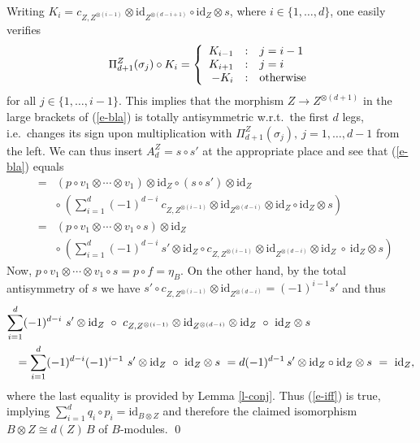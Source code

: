 \documentclass[11pt]{article}
\theoremstyle{definition}
\theoremstyle{definition}
\theoremstyle{remark}
\newcommand{\mcirc}{\circ}
\newcommand{\rarr}{\rightarrow}
\def\id{\mathrm{id}}
\begin{document}
Writing $K_i=c_{Z,Z^{\otimes(i-1)}}\otimes\id_{Z^{\otimes(d-i+1)}} \circ \id_Z\otimes s$, where
$i\in\{1,\ldots,d\}$, one easily verifies
\[ \Pi^Z_{d+1}(\sigma_j)\mcirc K_i= \left\{ 
\begin{array} {r@{\quad:\quad}l}
  K_{i-1} & j=i-1 \\ K_{i+1} & j=i \\ -K_i & \mbox{otherwise}
\end{array}\right. \]
for all $j\in\{1,\ldots,i-1\}$. This implies that the morphism $Z\rarr Z^{\otimes (d+1)}$ in the
large brackets of (\ref{e-bla}) is totally antisymmetric w.r.t.\ the first $d$ legs, i.e.\ changes
its sign upon multiplication with $\Pi_{d+1}^Z(\sigma_j),\ j=1,\ldots,d-1$ from the left. 
We can thus insert $A_d^Z=s\circ s'$ at the appropriate place and see that (\ref{e-bla}) equals
\begin{eqnarray*} &=& (p \mcirc v_1\otimes \cdots\otimes v_1) \otimes\id_Z  \circ 
  (s\circ s')\otimes\id_Z \\
&& \circ\ \left(\sum_{i=1}^d (-1)^{d-i}\ c_{Z,Z^{\otimes(i-1)}}\otimes
     \id_{Z^{\otimes(d-i)}} \otimes\id_Z \circ \id_Z\otimes s \right) \\
 &=& (p\mcirc v_1\otimes \cdots\otimes v_1\mcirc
 s)\otimes\id_Z \\
&& \circ\ \left(\sum_{i=1}^d (-1)^{d-i}\
   s'\otimes\id_Z \circ c_{Z,Z^{\otimes(i-1)}}\otimes\id_{Z^{\otimes(d-i)}} \otimes\id_Z\ \circ\
  \id_Z\otimes s \right) 
\end{eqnarray*}
Now, $p\mcirc v_1\otimes \cdots\otimes v_1\mcirc s=p\mcirc f=\eta_B$.
On the other hand, by the total antisymmetry of $s$ we have 
$s'\mcirc c_{Z,Z^{\otimes(i-1)}}\otimes\id_{Z^{\otimes(d-i)}}=(-1)^{i-1}s'$ and thus
\begin{eqnarray*} \lefteqn{ \sum_{i=1}^d (-1)^{d-i}\ s'\otimes\id_Z\ \circ\
   c_{Z,Z^{\otimes(i-1)}}\otimes\id_{Z^{\otimes(d-i)}} \otimes\id_Z\ \circ\ \id_Z\otimes s } \\
   && = \sum_{i=1}^d (-1)^{d-i}(-1)^{i-1}\ s'\otimes\id_Z\ \circ\ \id_Z\otimes s
   \ = d(-1)^{d-1}\,s'\otimes\id_Z \circ \id_Z\otimes s \ = \ \id_Z, 
\end{eqnarray*}
where the last equality is provided by Lemma \ref{l-conj}. Thus (\ref{e-iff}) is true, implying
$\sum_{i=1}^d q_i\circ p_i=\id_{B\otimes Z}$ and therefore the claimed isomorphism
$B\otimes Z\cong d(Z)\,B$ of $B$-modules.
\qed
\end{document}
